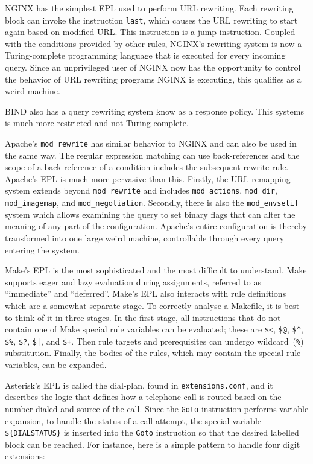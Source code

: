 \documentclass[letterpaper,twocolumn,10pt]{article}
\begin{document}
NGINX has the simplest EPL used to perform URL rewriting. Each rewriting block can invoke the instruction \texttt{last}, which causes the URL rewriting to start again based on modified URL. This instruction is a jump instruction. Coupled with the conditions provided by other rules, NGINX's rewriting system is now a Turing-complete programming language that is executed for every incoming query. Since an unprivileged user of NGINX now has the opportunity to control the behavior of URL rewriting programs NGINX is executing, this qualifies as a weird machine.

BIND also has a query rewriting system know as a response policy. This systems is much more restricted and not Turing complete.

Apache's \verb!mod_rewrite! has similar behavior to NGINX and can also be used in the same way. The regular expression matching can use back-references and the scope of a back-reference of a condition includes the subsequent rewrite rule. Apache's EPL is much more pervasive than this. Firstly, the URL remapping system extends beyond \verb!mod_rewrite! and includes \verb!mod_actions!, \verb!mod_dir!, \verb!mod_imagemap!, and \verb!mod_negotiation!. Secondly, there is also the \verb!mod_envsetif! system which allows examining the query to set binary flags that can alter the meaning of any part of the configuration. Apache's entire configuration is thereby transformed into one large weird machine, controllable through every query entering the system.

Make's EPL is the most sophisticated and the most difficult to understand. Make supports eager and lazy evaluation during assignments, referred to as ``immediate'' and ``deferred''. Make's EPL also interacts with rule definitions which are a somewhat separate stage. To correctly analyse a Makefile, it is best to think of it in three stages. In the first stage, all instructions that do not contain one of Make special rule variables can be evaluated; these are \texttt{\$<}, \texttt{\$@}, \texttt{\$\^{}}, \texttt{\$\%}, \texttt{\$?}, \texttt{\$|}, and \texttt{\$+}. Then rule targets and prerequisites can undergo wildcard~(\texttt{\%}) substitution. Finally, the bodies of the rules, which may contain the special rule variables, can be expanded.

Asterisk's EPL is called the dial-plan, found in \texttt{extensions.conf}, and it describes the logic that defines how a telephone call is routed based on the number dialed and source of the call. Since the \texttt{Goto} instruction performs variable expansion, to handle the status of a call attempt, the special variable \texttt{\$\{DIALSTATUS\}} is inserted into the \texttt{Goto} instruction so that the desired labelled block can be reached. For instance, here is a simple pattern to handle four digit extensions:
\end{document}
